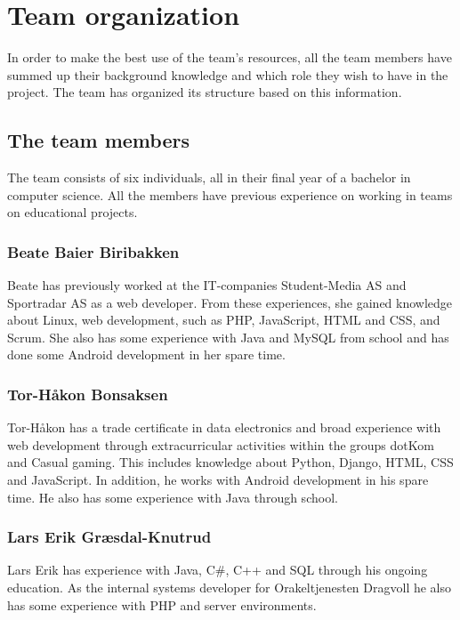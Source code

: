 \section{Team organization}
In order to make the best use of the team's resources, all the team members have summed up their background knowledge and which role they wish to have in the project. The team has organized its structure based on this information.

\subsection{The team members}
The team consists of six individuals, all in their final year of a bachelor in computer science. All the members have previous experience on working in teams on educational projects.

\subsubsection{Beate Baier Biribakken}
Beate has previously worked at the IT-companies Student-Media AS\cite{studentmedia} and Sportradar AS\cite{sportradar} as a web developer. From these experiences, she gained knowledge about Linux, web development, such as PHP, JavaScript, HTML and CSS, and Scrum. She also has some experience with Java and MySQL from school and has done some Android development in her spare time.

\subsubsection{Tor-Håkon Bonsaksen}
Tor-Håkon has a trade certificate in data electronics and broad experience with web development through extracurricular activities within the groups dotKom\cite{dotkom} and Casual gaming\cite{casualgaming}. This includes knowledge about Python, Django, HTML, CSS and JavaScript. In addition, he works with Android development in his spare time. He also has some experience with Java through school.

\subsubsection{Lars Erik Græsdal-Knutrud}
Lars Erik has experience with Java, C\#, C++ and SQL through his ongoing education. As the internal systems developer for Orakeltjenesten Dragvoll\cite{orakeltjenesten} he also has some experience with PHP and server environments. 


